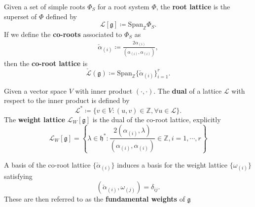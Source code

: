 \documentclass[11pt,fleqn]{article}
\begin{document}
\begin{definition}
	Given a set of simple roots $\Phi_S$ for a root system $\Phi$, the \textbf{root lattice} is the superset of $\Phi$ defined by
		\begin{equation}
			\mathcal{L}[\mathfrak{g}] \coloneqq \text{Span}_\mathbb{Z} \Phi_S.
		\end{equation}
	If we define the \textbf{co-roots} associated to $\Phi_S$ as
		\begin{align}\label{eq:corootDef}
			\check{\alpha}_{(i)} \coloneqq \frac{2 \alpha_{(i)}}{(\alpha_{(i)}, \alpha_{(i)})},
		\end{align}
	then the \textbf{co-root lattice} is
		\begin{equation}
			\check{\mathcal{L}}(\mathfrak{g}) \coloneqq \text{Span}_\mathbb{Z} \{ \check{\alpha}_{(i)} \}_{i=1}^r.
		\end{equation}
\end{definition}

\begin{definition}
		Given a vector space $V$ with inner product $(\cdot,\cdot)$. The \textbf{dual} of a lattice $\mathcal{L}$ with respect to the inner product is defined by
			\begin{equation}
				\mathcal{L}^* \coloneqq \{ v \in V : (u,v) \in \mathbb{Z}, \forall u \in \mathcal{L} \}.
			\end{equation}
		The \textbf{weight lattice} $\mathcal{L}_W [\mathfrak{g}]$ is the dual of the co-root lattice, explicitly
			\begin{equation}\label{eq:weightLatticeExplicit}
				\mathcal{L}_W[\mathfrak{g}] = \left\{ \lambda \in \mathfrak{h}^* : \frac{2(\alpha_{(i)},\lambda)}{(\alpha_{(i)},\alpha_{(i)})} \in \mathbb{Z}, i = 1, \cdots, r \right\}
			\end{equation}
\end{definition}

\begin{definition}
	A basis of the co-root lattice $\{\check{\alpha}_{(i)}\}$ induces a basis for the weight lattice $\{\omega_{(i)}\}$ satisfying
		\begin{equation}\label{eq:FundWeighDef}
			(\check{\alpha}_{(i)}, \omega_{(j)} ) = \delta_{ij}.
		\end{equation}
	These are then referred to as the \textbf{fundamental weights} of $\mathfrak{g}$
\end{definition}
\end{document}
